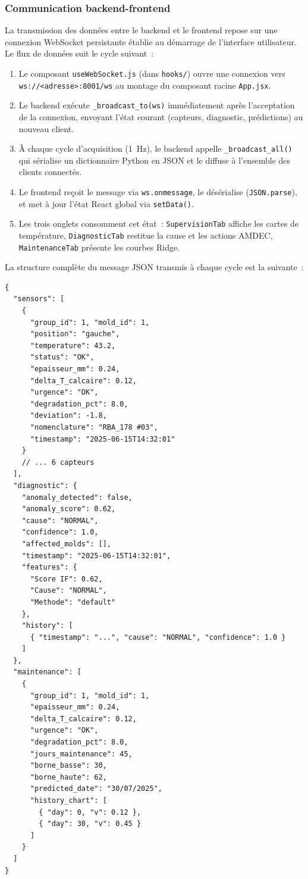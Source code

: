 \subsubsection{Communication backend-frontend}

La transmission des données entre le backend et le frontend repose sur une connexion WebSocket persistante établie au démarrage de l'interface utilisateur. Le flux de données suit le cycle suivant~:

\begin{enumerate}
  \item Le composant \texttt{useWebSocket.js} (dans \texttt{hooks/}) ouvre une connexion vers \texttt{ws://<adresse>:8001/ws} au montage du composant racine \texttt{App.jsx}.
  \item Le backend exécute \texttt{\_broadcast\_to(ws)} immédiatement après l'acceptation de la connexion, envoyant l'état courant (capteurs, diagnostic, prédictions) au nouveau client.
  \item À chaque cycle d'acquisition (1~Hz), le backend appelle \texttt{\_broadcast\_all()} qui sérialise un dictionnaire Python en JSON et le diffuse à l'ensemble des clients connectés.
  \item Le frontend reçoit le message via \texttt{ws.onmessage}, le désérialise (\texttt{JSON.parse}), et met à jour l'état React global via \texttt{setData()}.
  \item Les trois onglets consomment cet état~: \texttt{SupervisionTab} affiche les cartes de température, \texttt{DiagnosticTab} restitue la cause et les actions AMDEC, \texttt{MaintenanceTab} présente les courbes Ridge.
\end{enumerate}

La structure complète du message JSON transmis à chaque cycle est la suivante~:

\begin{verbatim}
{
  "sensors": [
    {
      "group_id": 1, "mold_id": 1,
      "position": "gauche",
      "temperature": 43.2,
      "status": "OK",
      "epaisseur_mm": 0.24,
      "delta_T_calcaire": 0.12,
      "urgence": "OK",
      "degradation_pct": 8.0,
      "deviation": -1.8,
      "nomenclature": "RBA_178 #03",
      "timestamp": "2025-06-15T14:32:01"
    }
    // ... 6 capteurs
  ],
  "diagnostic": {
    "anomaly_detected": false,
    "anomaly_score": 0.62,
    "cause": "NORMAL",
    "confidence": 1.0,
    "affected_molds": [],
    "timestamp": "2025-06-15T14:32:01",
    "features": {
      "Score IF": 0.62,
      "Cause": "NORMAL",
      "Methode": "default"
    },
    "history": [
      { "timestamp": "...", "cause": "NORMAL", "confidence": 1.0 }
    ]
  },
  "maintenance": [
    {
      "group_id": 1, "mold_id": 1,
      "epaisseur_mm": 0.24,
      "delta_T_calcaire": 0.12,
      "urgence": "OK",
      "degradation_pct": 8.0,
      "jours_maintenance": 45,
      "borne_basse": 30,
      "borne_haute": 62,
      "predicted_date": "30/07/2025",
      "history_chart": [
        { "day": 0, "v": 0.12 },
        { "day": 30, "v": 0.45 }
      ]
    }
  ]
}
\end{verbatim}

